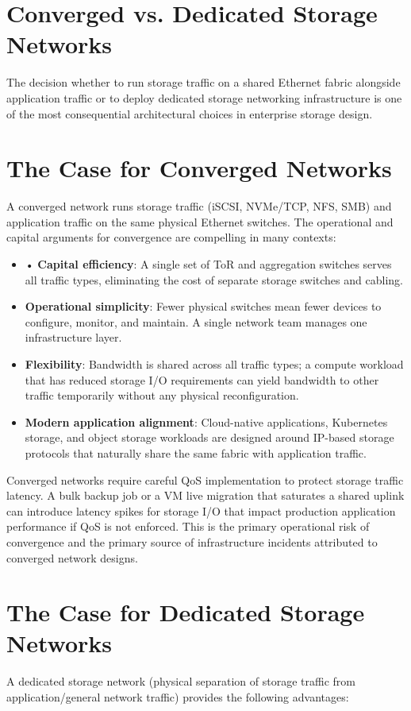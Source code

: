 \section{Converged vs. Dedicated Storage Networks}
The decision whether to run storage traffic on a shared Ethernet fabric alongside application traffic or to deploy dedicated storage networking infrastructure is one of the most consequential architectural choices in enterprise storage design.

\section{The Case for Converged Networks}
A converged network runs storage traffic (iSCSI, NVMe/TCP, NFS, SMB) and application traffic on the same physical Ethernet switches. The operational and capital arguments for convergence are compelling in many contexts:

\begin{itemize}
  \item • \textbf{Capital efficiency}: A single set of ToR and aggregation switches serves all traffic types, eliminating the cost of separate storage switches and cabling.
  \item \textbf{Operational simplicity}: Fewer physical switches mean fewer devices to configure, monitor, and maintain. A single network team manages one infrastructure layer.
  \item \textbf{Flexibility}: Bandwidth is shared across all traffic types; a compute workload that has reduced storage I/O requirements can yield bandwidth to other traffic temporarily without any physical reconfiguration.
  \item \textbf{Modern application alignment}: Cloud-native applications, Kubernetes storage, and object storage workloads are designed around IP-based storage protocols that naturally share the same fabric with application traffic.
\end{itemize}

Converged networks require careful QoS implementation to protect storage traffic latency. A bulk backup job or a VM live migration that saturates a shared uplink can introduce latency spikes for storage I/O that impact production application performance if QoS is not enforced. This is the primary operational risk of convergence and the primary source of infrastructure incidents attributed to converged network designs.

\section{The Case for Dedicated Storage Networks}
A dedicated storage network (physical separation of storage traffic from application/general network traffic) provides the following advantages:


